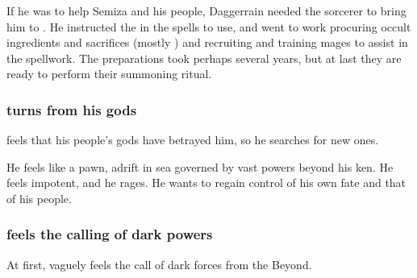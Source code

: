 If he was to help Semiza and his people, Daggerrain needed the \nephil{} sorcerer to bring him to \Miith{}. 
He instructed the \nephil{} in the spells to use, and \Semiza{} went to work procuring occult ingredients and sacrifices (mostly \scathae) and recruiting and training mages to assist in the spellwork. 
The preparations took perhaps several years, but at last they are ready to perform their summoning ritual. 







\subsubsection{\Semiza{} turns from his gods}
\Semiza{} feels that his people's gods have betrayed him, so he searches for new ones. 

He feels like a pawn, adrift in sea governed by vast powers beyond his ken. 
He feels impotent, and he rages. 
He wants to regain control of his own fate and that of his people. 






\subsubsection{\Semiza{} feels the calling of dark powers}
At first, \Semiza{} vaguely feels the call of dark forces from the Beyond. 


